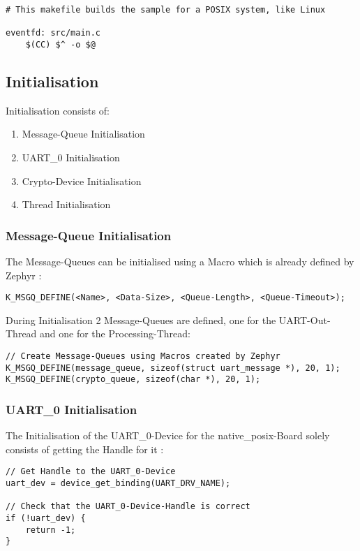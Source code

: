 \begin{lstlisting}[caption=Makefile.posix]
# This makefile builds the sample for a POSIX system, like Linux

eventfd: src/main.c
	$(CC) $^ -o $@
\end{lstlisting}

\pagebreak

\subsection{Initialisation}

Initialisation consists of:
\begin{enumerate}
	\item Message-Queue Initialisation
	\item UART\_0 Initialisation
	\item Crypto-Device Initialisation
	\item Thread Initialisation
\end{enumerate}

\subsubsection{Message-Queue Initialisation}

The Message-Queues can be initialised using a Macro which
is already defined by Zephyr :
\\
\begin{lstlisting}[style=CStyle, caption=Message Queue Initialisation]
K_MSGQ_DEFINE(<Name>, <Data-Size>, <Queue-Length>, <Queue-Timeout>);
\end{lstlisting}
During Initialisation 2 Message-Queues are defined, one for
the UART-Out-Thread and one for the Processing-Thread:
\\
\begin{lstlisting}[style=CStyle]
// Create Message-Queues using Macros created by Zephyr
K_MSGQ_DEFINE(message_queue, sizeof(struct uart_message *), 20, 1);
K_MSGQ_DEFINE(crypto_queue, sizeof(char *), 20, 1);
\end{lstlisting}

\subsubsection{UART\_0 Initialisation}

The Initialisation of the UART\_0-Device for the native\_posix-Board
solely consists of getting the Handle for it :
\\
\begin{lstlisting}[style=CStyle,caption=UART 0 Initialisation]
// Get Handle to the UART_0-Device
uart_dev = device_get_binding(UART_DRV_NAME);

// Check that the UART_0-Device-Handle is correct
if (!uart_dev) {
	return -1;
}
\end{lstlisting}

